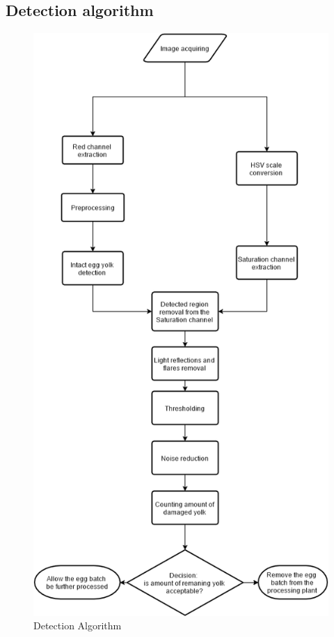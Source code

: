 \documentclass[12pt,twoside,a4paper]{article}
\begin{document}
\subsection{Detection algorithm}

\begin{figure}[H]
\centering
\includegraphics[width=0.5\paperwidth]{algorithmV}
\caption{Detection Algorithm}
\end{figure}
\end{document}
